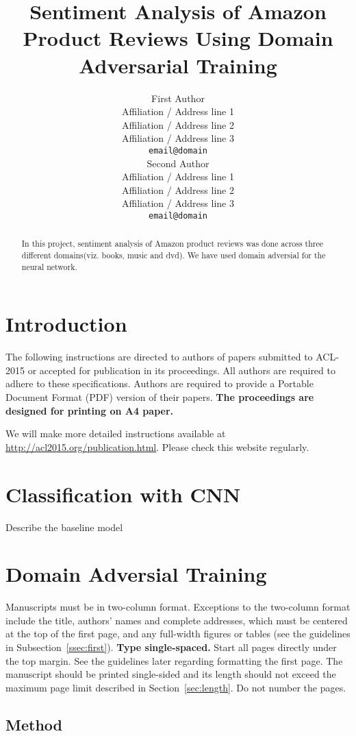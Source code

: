 \documentclass[11pt,a4paper]{article}
\title{Sentiment Analysis of Amazon Product Reviews Using Domain Adversarial Training}
\author{First Author \\
  Affiliation / Address line 1 \\
  Affiliation / Address line 2 \\
  Affiliation / Address line 3 \\
  {\tt email@domain} \\\And
  Second Author \\
  Affiliation / Address line 1 \\
  Affiliation / Address line 2 \\
  Affiliation / Address line 3 \\
  {\tt email@domain} \\}
\date{}
\begin{document}
\maketitle
\begin{abstract}
  In this project, sentiment analysis of Amazon product reviews was
  done across three different domains(viz. books, music and dvd). We
  have used domain adversial for the neural network.
\end{abstract}

\section{Introduction}

The following instructions are directed to authors of papers submitted
to ACL-2015 or accepted for publication in its proceedings. All
authors are required to adhere to these specifications. Authors are
required to provide a Portable Document Format (PDF) version of their
papers. \textbf{The proceedings are designed for printing on A4
paper.}

We will make more detailed instructions available at
\url{http://acl2015.org/publication.html}. Please check this website
regularly.


\section{Classification with CNN}

Describe the baseline model

\section{Domain Adversial Training}

Manuscripts must be in two-column format.  Exceptions to the
two-column format include the title, authors' names and complete
addresses, which must be centered at the top of the first page, and
any full-width figures or tables (see the guidelines in
Subsection~\ref{ssec:first}). {\bf Type single-spaced.}  Start all
pages directly under the top margin. See the guidelines later
regarding formatting the first page.  The manuscript should be
printed single-sided and its length
should not exceed the maximum page limit described in Section~\ref{sec:length}.
Do not number the pages.


\subsection{Method}
\end{document}
